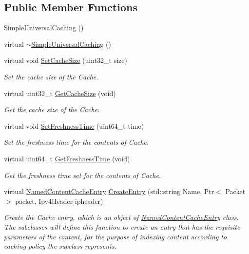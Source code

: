 \subsection*{Public Member Functions}
\begin{DoxyCompactItemize}
\item 
\hyperlink{classns3_1_1SimpleUniversalCaching_a818bfd8d8077eef52cc33156373e00b5}{Simple\-Universal\-Caching} ()
\item 
virtual \hyperlink{classns3_1_1SimpleUniversalCaching_ac7a548d505befd6a65108bc043ab0715}{$\sim$\-Simple\-Universal\-Caching} ()
\item 
virtual void \hyperlink{classns3_1_1SimpleUniversalCaching_aa6123b2df8e357e30b84edf190d874c8}{Set\-Cache\-Size} (uint32\-\_\-t size)
\begin{DoxyCompactList}\small\item\em Set the cache size of the Cache. \end{DoxyCompactList}\item 
virtual uint32\-\_\-t \hyperlink{classns3_1_1SimpleUniversalCaching_a923d1d730c8d0171e2366773b950d165}{Get\-Cache\-Size} (void)
\begin{DoxyCompactList}\small\item\em Get the cache size of the Cache. \end{DoxyCompactList}\item 
virtual void \hyperlink{classns3_1_1SimpleUniversalCaching_a356fd57c44d67a96db68c5dbd0d8471c}{Set\-Freshness\-Time} (uint64\-\_\-t time)
\begin{DoxyCompactList}\small\item\em Set the freshness time for the contents of Cache. \end{DoxyCompactList}\item 
virtual uint64\-\_\-t \hyperlink{classns3_1_1SimpleUniversalCaching_a164cda8301046d0123443419528c6b3e}{Get\-Freshness\-Time} (void)
\begin{DoxyCompactList}\small\item\em Get the freshness time set for the contents of Cache. \end{DoxyCompactList}\item 
virtual \hyperlink{classns3_1_1NamedContentCacheEntry}{Named\-Content\-Cache\-Entry} \hyperlink{classns3_1_1SimpleUniversalCaching_a95d289d9580f5af31885b8deb9738451}{Create\-Entry} (std\-::string Name, Ptr$<$ Packet $>$ packet, Ipv4\-Header ipheader)
\begin{DoxyCompactList}\small\item\em Create the Cache entry, which is an object of \hyperlink{classns3_1_1NamedContentCacheEntry}{Named\-Content\-Cache\-Entry} class. The subclasses will define this function to create an entry that has the requisite parameters of the content, for the purpose of indexing content according to caching policy the subclass represents. \end{DoxyCompactList}\item 

\end{DoxyCompactItemize}
